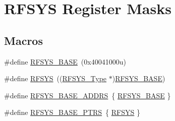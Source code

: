 \hypertarget{group___r_f_s_y_s___register___masks}{}\section{R\+F\+S\+YS Register Masks}
\label{group___r_f_s_y_s___register___masks}
\subsection*{Macros}
\begin{DoxyCompactItemize}
\item 
\#define \mbox{\hyperlink{group___r_f_s_y_s___register___masks_ga742dcff49e1d900ccc5fb6d716dac969}{R\+F\+S\+Y\+S\+\_\+\+B\+A\+SE}}~(0x40041000u)
\item 
\#define \mbox{\hyperlink{group___r_f_s_y_s___register___masks_ga83a5a75f5421c69ce93437b8be3c1144}{R\+F\+S\+YS}}~((\mbox{\hyperlink{struct_r_f_s_y_s___type}{R\+F\+S\+Y\+S\+\_\+\+Type}} $\ast$)\mbox{\hyperlink{group___r_f_s_y_s___register___masks_ga742dcff49e1d900ccc5fb6d716dac969}{R\+F\+S\+Y\+S\+\_\+\+B\+A\+SE}})
\item 
\#define \mbox{\hyperlink{group___r_f_s_y_s___register___masks_ga65742e072e59ddefb5bc976bbd6f517b}{R\+F\+S\+Y\+S\+\_\+\+B\+A\+S\+E\+\_\+\+A\+D\+D\+RS}}~\{ \mbox{\hyperlink{group___r_f_s_y_s___register___masks_ga742dcff49e1d900ccc5fb6d716dac969}{R\+F\+S\+Y\+S\+\_\+\+B\+A\+SE}} \}
\item 
\#define \mbox{\hyperlink{group___r_f_s_y_s___register___masks_ga59f6caa8732744ac3a9f91828ec2daa1}{R\+F\+S\+Y\+S\+\_\+\+B\+A\+S\+E\+\_\+\+P\+T\+RS}}~\{ \mbox{\hyperlink{group___r_f_s_y_s___register___masks_ga83a5a75f5421c69ce93437b8be3c1144}{R\+F\+S\+YS}} \}
\end{DoxyCompactItemize}
